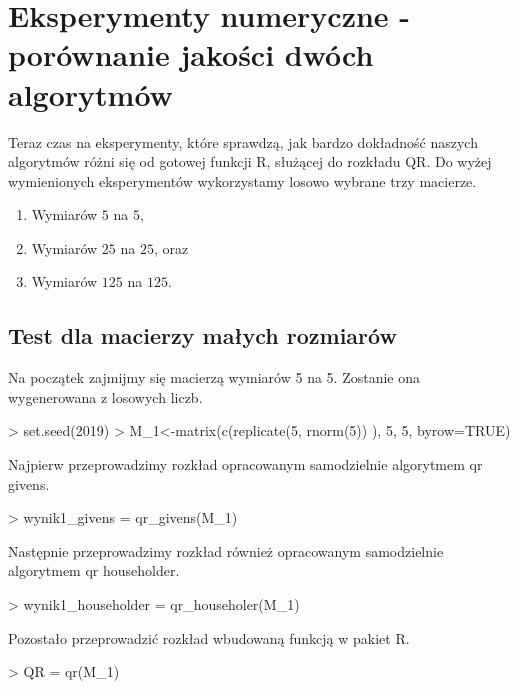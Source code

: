 \documentclass[12pt,a4paper]{report}
\begin{document}
\section{Eksperymenty numeryczne - porównanie jakości dwóch algorytmów}

Teraz czas na eksperymenty, które sprawdzą, jak bardzo dokładność naszych algorytmów różni się od gotowej funkcji R, służącej do rozkładu QR.
Do wyżej wymienionych eksperymentów wykorzystamy losowo wybrane trzy macierze.
\begin{enumerate}
\item Wymiarów $5$ na $5$,
\item Wymiarów $25$ na $25$, oraz
\item Wymiarów $125$ na $125$.
\end{enumerate}


\subsection{Test dla macierzy małych rozmiarów}
Na początek zajmijmy się macierzą wymiarów 5 na 5. Zostanie ona wygenerowana z losowych liczb.

\begin{Schunk}
\begin{Sinput}
> set.seed(2019)
> M_1<-matrix(c(replicate(5, rnorm(5)) ), 5, 5, byrow=TRUE)
\end{Sinput}
\end{Schunk}

Najpierw przeprowadzimy rozkład opracowanym samodzielnie algorytmem qr givens.

\begin{Schunk}
\begin{Sinput}
> wynik1_givens = qr_givens(M_1)
\end{Sinput}
\end{Schunk}

Następnie przeprowadzimy rozkład również opracowanym samodzielnie algorytmem qr householder.

\begin{Schunk}
\begin{Sinput}
> wynik1_householder = qr_householer(M_1)
\end{Sinput}
\end{Schunk}

Pozostało przeprowadzić rozkład wbudowaną funkcją w pakiet R.

\begin{Schunk}
\begin{Sinput}
> QR = qr(M_1)
\end{Sinput}
\end{Schunk}
\end{document}
